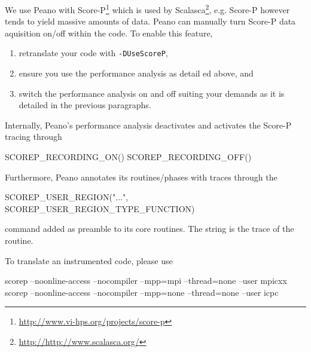 We use Peano with Score-P\footnote{\url{http://www.vi-hps.org/projects/score-p}}
which is used by Scalasca\footnote{\url{http://http://www.scalasca.org/}}, e.g.
Score-P however tends to yield massive amounts of data. 
Peano can manually turn Score-P data aquisition on/off within the code. 
To enable this feature,
\begin{enumerate}
  \item retranslate your code with \texttt{-DUseScoreP},
  \item ensure you use the performance analysis as detail ed above, and
  \item switch the performance analysis on and off suiting your demands as it is
  detailed in the previous paragraphs.
\end{enumerate}


\noindent
Internally, Peano's performance analysis deactivates and activates the Score-P
tracing through
\begin{code}
SCOREP_RECORDING_ON()
SCOREP_RECORDING_OFF()
\end{code}

\noindent 
Furthermore, Peano annotates its routines/phases with traces through the 
\begin{code} 
SCOREP_USER_REGION("...", SCOREP_USER_REGION_TYPE_FUNCTION)
\end{code}
command added as preamble to its core routines. 
The string is the trace of the routine.


To translate an instrumented code, please use
\begin{code}
scorep --noonline-access --nocompiler --mpp=mpi  --thread=none --user mpicxx
scorep --noonline-access --nocompiler --mpp=none  --thread=none --user icpc
\end{code}
